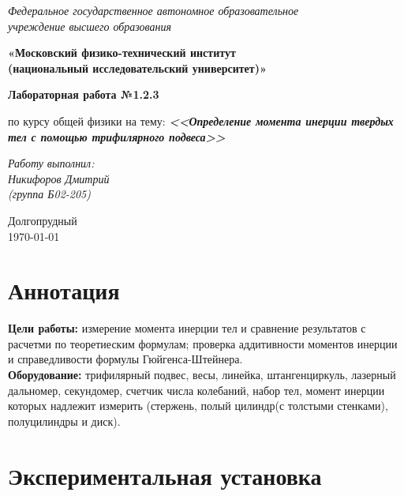 \documentclass[a4paper,14pt]{extarticle}
\begin{document}
	\begin{center}
		\textit{Федеральное государственное автономное образовательное\\ учреждение высшего образования }
		
		\vspace{0.5ex}
		
		\textbf{«Московский физико-технический институт\\ (национальный исследовательский университет)»}
	\end{center}
	
	\vspace{10ex}
	
	
	\begin{center}
		\vspace{13ex}	
		\textbf{Лабораторная работа №1.2.3}	
		\vspace{1ex}
		
		по курсу общей физики		
		на тему:		
		\textbf{\textit{<<Определение момента инерции твердых тел с помощью трифилярного подвеса>>}}		
		\vspace{30ex}
		
		\begin{flushright}
			\noindent
			\textit{Работу выполнил:}\\  
			\textit{Никифоров Дмитрий \\(группа Б02-205)}
		\end{flushright}
		\vfill
		Долгопрудный \\ \today
		
	\end{center}
	\newpage
	\section{Аннотация}

	\textbf{Цели работы:} измерение момента инерции тел и сравнение результатов с расчетми по теоретиеским формулам; проверка аддитивности моментов инерции и справедливости формулы Гюйгенса-Штейнера.\\
	\textbf{Оборудование:} трифилярный подвес, весы, линейка, штангенциркуль, лазерный дальномер, секундомер, счетчик числа колебаний, набор тел, момент инерции которых надлежит измерить (стержень, полый цилиндр(с толстыми стенками), полуцилиндры и диск).
	
	\section {Экспериментальная установка}
	
\end{document}
